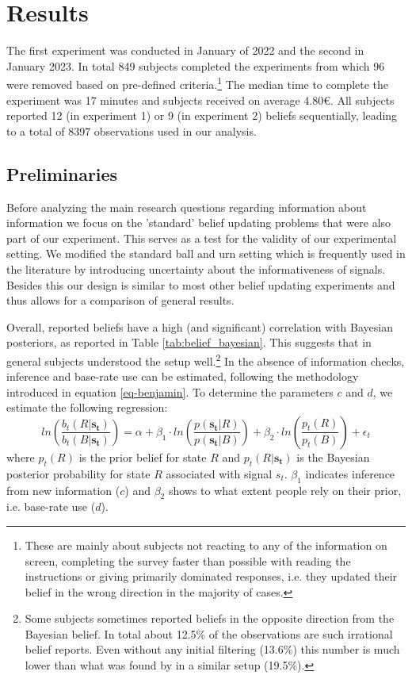 \documentclass{article}
\begin{document}
\section{Results}

The first experiment was conducted in January of 2022 and the second in January 2023. In total 849 subjects completed the experiments from which 96 were removed based on pre-defined criteria.\footnote{These are mainly about subjects not reacting to any of the information on screen, completing the survey faster than possible with reading the instructions or giving primarily dominated responses, i.e. they updated their belief in the wrong direction in the majority of cases.} The median time to complete the experiment was 17 minutes and subjects received on average 4.80\euro. All subjects reported 12 (in experiment 1) or 9 (in experiment 2) beliefs sequentially, leading to a total of 8397 observations used in our analysis.


\subsection{Preliminaries}

Before analyzing the main research questions regarding information about information we focus on the 'standard' belief updating problems that were also part of our experiment. This serves as a test for the validity of our experimental setting. We modified the standard ball and urn setting which is frequently used in the literature by introducing uncertainty about the informativeness of signals. Besides this our design is similar to most other belief updating experiments and thus allows for a comparison of general results.

Overall, reported beliefs have a high (and significant) correlation with Bayesian posteriors, as reported in Table \ref{tab:belief_bayesian}. This suggests that in general subjects understood the setup well.\footnote{Some subjects sometimes reported beliefs in the opposite direction from the Bayesian belief. In total about 12.5\% of the observations are such irrational belief reports. Even without any initial filtering (13.6\%) this number is much lower than what was found by \cite{Goncalves2022} in a similar setup (19.5\%).} In the absence of information checks, inference and base-rate use can be estimated, following the methodology introduced in equation \ref{eq-benjamin}. To determine the parameters $c$ and $d$, we estimate the following regression:
\begin{equation}
\label{eq-reg-inference}
ln(\frac{b_t(R|\mathbf{s_t})}{b_t(B|\mathbf{s_t})}) = \alpha + \beta_1 \cdot ln(\frac{p(\mathbf{s_t}|R)}{p(\mathbf{s_t}|B)}) + \beta_2 \cdot ln(\frac{p_t(R)}{p_t(B)}) + \epsilon_t
\end{equation}
where $p_t(R)$ is the prior belief for state $R$ and $p_t(R|\mathbf{s_t})$ is the Bayesian posterior probability for state $R$ associated with signal $s_t$. $\beta_1$ indicates inference from new information ($c$) and $\beta_2$ shows to what extent people rely on their prior, i.e. base-rate use ($d$). 
\end{document}
